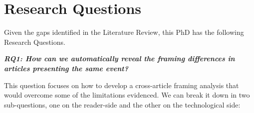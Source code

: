 \chapter{Research Questions}
\label{chap:research_questions}


Given the gaps identified in the Literature Review, this PhD has the following Research Questions.

\vspace{12px}

\textit{\textbf{RQ1: How can we automatically reveal the framing differences in articles presenting the same event?}}

\vspace{12px}

This question focuses on how to develop a cross-article framing analysis that would overcome some of the limitations evidenced.
We can break it down in two sub-questions, one on the reader-side and the other on the technological side:

